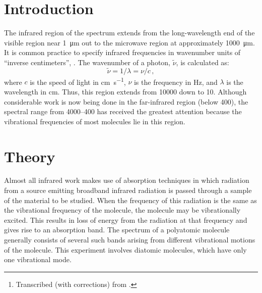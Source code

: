 \maketitle%

\begin{abstract}
\noindent
This experiment is concerned with the rotational fine structure of the infrared vibrational spectrom of a linear molecule such as . By interpreting the details of this spectrum, it is possible to obtain the moment of inertia of the molecule and thus the internuclear separation. In addition, the pure vibrational frequency determines the force constant that is a measure of the bond strength. By also investigating , the isotope effect can be observed.\thanks{Transcribed (with corrections) from \textcite{nibler14}.}
\end{abstract}

\section{Introduction} %
\label{sec:intro}

The infrared region of the spectrum extends from the long-wavelength end of the visible region near \SI{1}{\um} out to the microwave region at approximately \SI{1000}{\um}.
It is common practice to specify infrared frequencies in wavenumber units of ``inverse centimeters'', \si{\wn}. 
The wavenumber of a photon, \( \widetilde{\nu} \), is calculated as: 
\begin{equation}
  \widetilde{\nu} = 1/\lambda = \nu/c \, ,
\end{equation} 
where \( c \) is the speed of light in \si{\cm \per \s}, \( \nu \) is the frequency in \si{\Hz}, and \( \lambda \) is the wavelength in \si{\cm}.
Thus, this region extends from \SI{10000}{\wn} down to \SI{10}{\wn}. 
Although considerable work is now being done in the far-infrared region (below \SI{400}{\wn}), the spectral range from \SIrange{4000}{400}{\wn} has received the greatest attention because the vibrational frequencies of most molecules lie in this region. 


\section{Theory} %
\label{sec:theory}

Almost all infrared work makes use of absorption techniques in which radiation from a source emitting broadband infrared radiation is passed through a sample of the material to be studied. 
When the frequency of this radiation is the same as the vibrational frequency of the molecule, the molecule may be vibrationally excited.
This results in loss of energy from the radiation at that frequency and gives rise to an absorption band. 
The spectrum of a polyatomic molecule generally consists of several such bands arising from different vibrational motions of the molecule. 
This experiment involves diatomic molecules, which have only one vibrational mode. 

